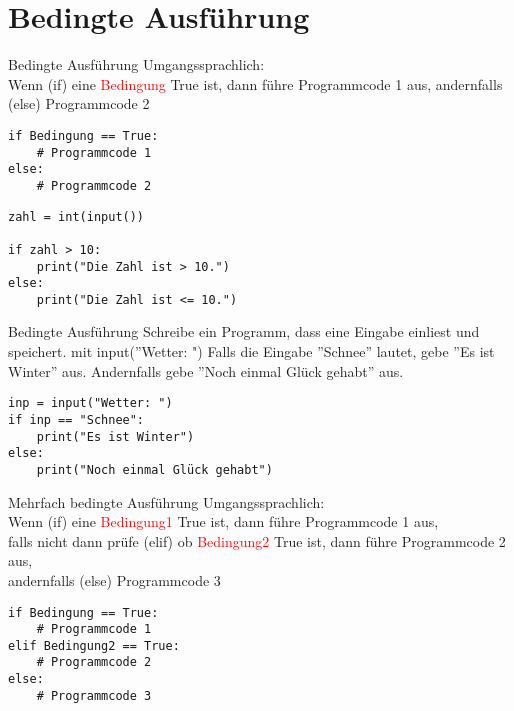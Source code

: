 \section{Bedingte Ausführung}

\begin{frame}[fragile]{Bedingte Ausführung}
Umgangssprachlich:\\ Wenn (if) eine \textcolor{red}{Bedingung} True ist, dann führe Programmcode 1 aus, andernfalls (else) Programmcode 2\\

\begin{lstlisting}
if Bedingung == True:
	# Programmcode 1 
else:
	# Programmcode 2 
\end{lstlisting}

\begin{lstlisting}
zahl = int(input())

if zahl > 10:
	print("Die Zahl ist > 10.")
else:
	print("Die Zahl ist <= 10.")
\end{lstlisting}
\end{frame}

\begin{frame}[fragile]{Bedingte Ausführung}
Schreibe ein Programm, dass eine Eingabe einliest und speichert. mit input(''Wetter: ")
Falls die Eingabe ''Schnee'' lautet, gebe ''Es ist Winter'' aus. Andernfalls gebe ''Noch einmal Glück gehabt'' aus.
\pause{}
\begin{lstlisting}
inp = input("Wetter: ")
if inp == "Schnee":
    print("Es ist Winter")
else:
    print("Noch einmal Glück gehabt")
\end{lstlisting}
\end{frame}

\begin{frame}[fragile]{Mehrfach bedingte Ausführung}
Umgangssprachlich:\\ Wenn (if) eine \textcolor{red}{Bedingung1} True ist, dann führe Programmcode 1 aus, \\falls nicht dann prüfe (elif) ob \textcolor{red}{Bedingung2} True ist, dann führe Programmcode 2 aus, \\andernfalls (else) Programmcode 3\\

\begin{lstlisting}
if Bedingung == True:
    # Programmcode 1
elif Bedingung2 == True:
    # Programmcode 2
else:
    # Programmcode 3
\end{lstlisting}
\end{frame}


